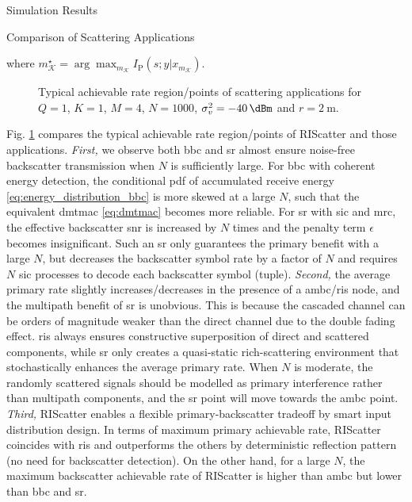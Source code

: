 \documentclass[journal]{IEEEtran}
\begin{document}
\begin{section}{Simulation Results}
\begin{subsection}{Comparison of Scattering Applications}
\begin{itemize}
\begin{equation}
			\end{equation}
			where $m_{\mathcal{K}}^{\star} = \arg \max_{m_{\mathcal{K}}} I_{\text{P}}(s;y|x_{m_{\mathcal{K}}})$.
		\end{itemize}
		\begin{figure}[!t]
			\centering
			\resizebox{0.65\columnwidth}{!}{
				
			}
			\caption{Typical achievable rate region/points of scattering applications for $Q=1$, $K=1$, $M=4$, $N=1000$, $\sigma_v^2=\qty{-40}{\dBm}$ and $r=\qty{2}{\meter}$.}
			\label{fg:region_comparison}
		\end{figure}

		Fig. \ref{fg:region_comparison} compares the typical achievable rate region/points of RIScatter and those applications.
		\emph{First,} we observe both \gls{bbc} and \gls{sr} almost ensure noise-free backscatter transmission when $N$ is sufficiently large.
		For \gls{bbc} with coherent energy detection, the conditional \gls{pdf} of accumulated receive energy \eqref{eq:energy_distribution_bbc} is more skewed at a large $N$, such that the equivalent \gls{dmtmac} \eqref{eq:dmtmac} becomes more reliable.
		For \gls{sr} with \gls{sic} and \gls{mrc}, the effective backscatter \gls{snr} is increased by $N$ times and the penalty term $\epsilon$ becomes insignificant.
		Such an \gls{sr} only guarantees the primary benefit with a large $N$, but decreases the backscatter symbol rate by a factor of $N$ and requires $N$ \gls{sic} processes to decode each backscatter symbol (tuple).
		\emph{Second,} the average primary rate slightly increases/decreases in the presence of a \gls{ambc}/\gls{ris} node, and the multipath benefit of \gls{sr} is unobvious.
		This is because the cascaded channel can be orders of magnitude weaker than the direct channel due to the double fading effect.
		\gls{ris} always ensures constructive superposition of direct and scattered components, while \gls{sr} only creates a quasi-static rich-scattering environment that stochastically enhances the average primary rate.
		When $N$ is moderate, the randomly scattered signals should be modelled as primary interference rather than multipath components, and the \gls{sr} point will move towards the \gls{ambc} point.
		\emph{Third,} RIScatter enables a flexible primary-backscatter tradeoff by smart input distribution design.
		In terms of maximum primary achievable rate, RIScatter coincides with \gls{ris} and outperforms the others by deterministic reflection pattern (no need for backscatter detection).
		On the other hand, for a large $N$, the maximum backscatter achievable rate of RIScatter is higher than \gls{ambc} but lower than \gls{bbc} and \gls{sr}.

\end{subsection}
\end{section}
\end{document}
